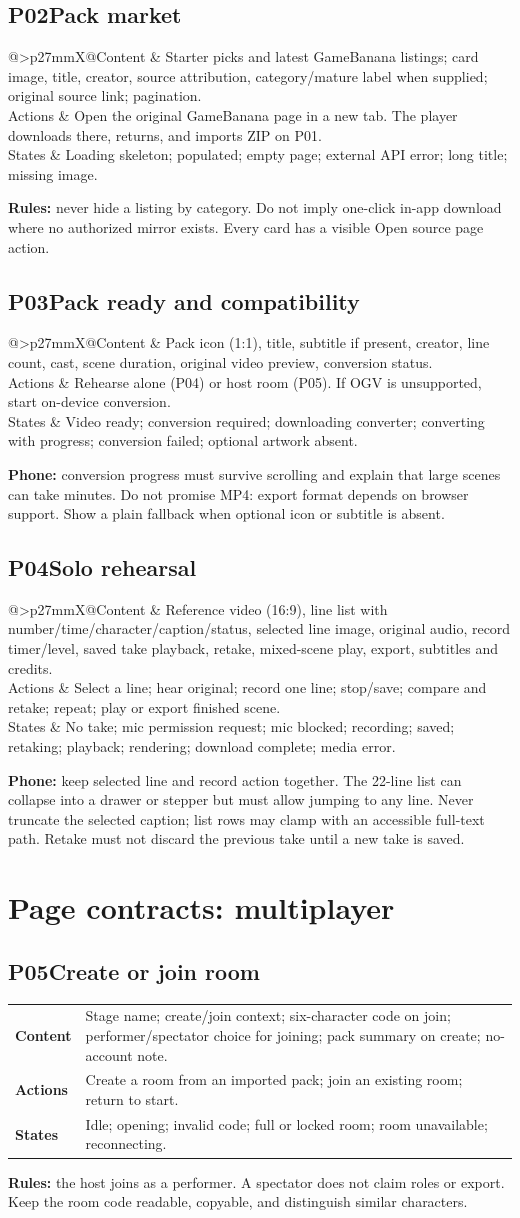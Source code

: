 \documentclass[10pt,a4paper]{article}
\makeatletter
\newcommand{\screen}[2]{\Needspace{60pt}\subsection*{\color{ink}#1\quad #2}}
\newcommand{\contract}[3]{\begin{tabularx}{\linewidth}{@{}>{\bfseries\color{teal}}p{27mm}X@{}}Content & #1\\[3pt]Actions & #2\\[3pt]States & #3\end{tabularx}}
\makeatother
\begin{document}
\screen{P02}{Pack market}
\contract{Starter picks and latest GameBanana listings; card image, title, creator, source attribution, category/mature label when supplied; original source link; pagination.}{Open the original GameBanana page in a new tab. The player downloads there, returns, and imports ZIP on P01.}{Loading skeleton; populated; empty page; external API error; long title; missing image.}
\textbf{Rules:} never hide a listing by category. Do not imply one-click in-app download where no authorized mirror exists. Every card has a visible Open source page action.

\screen{P03}{Pack ready and compatibility}
\contract{Pack icon (1:1), title, subtitle if present, creator, line count, cast, scene duration, original video preview, conversion status.}{Rehearse alone (P04) or host room (P05). If OGV is unsupported, start on-device conversion.}{Video ready; conversion required; downloading converter; converting with progress; conversion failed; optional artwork absent.}
\textbf{Phone:} conversion progress must survive scrolling and explain that large scenes can take minutes. Do not promise MP4: export format depends on browser support. Show a plain fallback when optional icon or subtitle is absent.

\screen{P04}{Solo rehearsal}
\contract{Reference video (16:9), line list with number/time/character/caption/status, selected line image, original audio, record timer/level, saved take playback, retake, mixed-scene play, export, subtitles and credits.}{Select a line; hear original; record one line; stop/save; compare and retake; repeat; play or export finished scene.}{No take; mic permission request; mic blocked; recording; saved; retaking; playback; rendering; download complete; media error.}
\textbf{Phone:} keep selected line and record action together. The 22-line list can collapse into a drawer or stepper but must allow jumping to any line. Never truncate the selected caption; list rows may clamp with an accessible full-text path. Retake must not discard the previous take until a new take is saved.

\clearpage
\section{Page contracts: multiplayer}
\screen{P05}{Create or join room}
\contract{Stage name; create/join context; six-character code on join; performer/spectator choice for joining; pack summary on create; no-account note.}{Create a room from an imported pack; join an existing room; return to start.}{Idle; opening; invalid code; full or locked room; room unavailable; reconnecting.}
\textbf{Rules:} the host joins as a performer. A spectator does not claim roles or export. Keep the room code readable, copyable, and distinguish similar characters.
\end{document}
